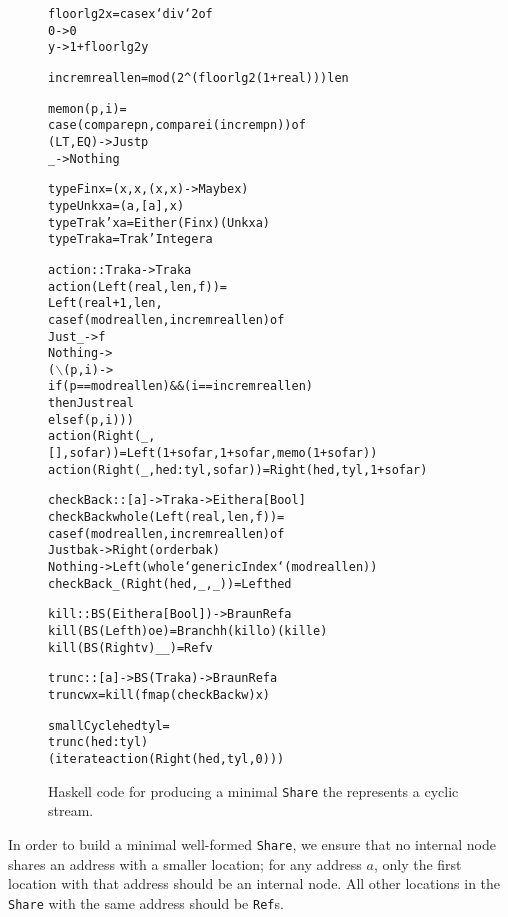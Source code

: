 \documentclass[envcountsect]{llncs}
\newcommand{\share}{{\tt Share} }
\begin{document}
\begin{figure}
\begin{alltt}
floorlg2 x = case x `div` 2 of
               0 -> 0
               y -> 1 + floorlg2 y

increm real len = mod (2^(floorlg2 (1+real))) len

memo n (p,i) =
    case (compare p n, compare i (increm p n)) of
      (LT,EQ) -> Just p
      _ -> Nothing

type Fin x = (x,x,(x,x) -> Maybe x)
type Unk x a = (a,[a],x)
type Trak' x a = Either (Fin x) (Unk x a)
type Trak a = Trak' Integer a

action :: Trak a -> Trak a
action (Left (real,len,f)) =
    Left (real+1,len,
          case f (mod real len, increm real len) of
            Just _ -> f
            Nothing -> 
                (\(\backslash\)(p,i) ->
                 if (p == mod real len) && (i == increm real len)
                 then Just real
                 else f (p,i)))
action (Right (_,[],sofar)) = Left (1+sofar,1+sofar,memo (1+sofar))
action (Right (_,hed:tyl,sofar)) = Right (hed,tyl,1+sofar)

checkBack :: [a] -> Trak a -> Either a [Bool]
checkBack whole (Left (real,len,f)) =
    case f (mod real len,increm real len) of
      Just bak -> Right (order bak)
      Nothing -> Left (whole `genericIndex` (mod real len)) 
checkBack _ (Right (hed,_,_)) = Left hed

kill :: BS (Either a [Bool]) -> BraunRef a
kill (BS (Left h) o e) = Branch h (kill o) (kill e)
kill (BS (Right v) _ _) = Ref v
    
trunc :: [a] -> BS (Trak a) -> BraunRef a
trunc w x = kill (fmap (checkBack w) x)

smallCycle hed tyl =
  trunc (hed:tyl)
    (iterate action (Right (hed,tyl,0)))
\end{alltt}
\caption{Haskell code for producing a minimal \share the represents a cyclic stream.}
\label{cycleDetails}
\end{figure}

In order to build a minimal well-formed {\tt Share}, we ensure that no internal node shares an address with a smaller location;
for any address $a$, only the first location with that address should be an internal node.
All other locations in the \share with the same address should be {\tt Ref}s.
\end{document}
